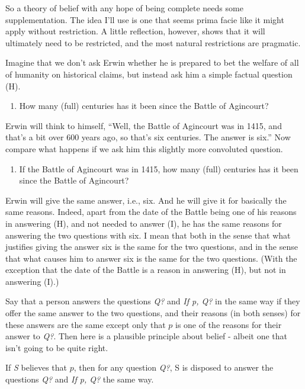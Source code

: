 \documentclass[11pt,]{book}
\providecommand{\tightlist}{%
  \setlength{\itemsep}{0pt}\setlength{\parskip}{0pt}}
\begin{document}
So a theory of belief with any hope of being complete needs some supplementation. The idea I'll use is one that seems prima facie like it might apply without restriction. A little reflection, however, shows that it will ultimately need to be restricted, and the most natural restrictions are pragmatic.

Imagine that we don't ask Erwin whether he is prepared to bet the welfare of all of humanity on historical claims, but instead ask him a simple factual question (H).

\begin{enumerate}
\def\labelenumi{(\Alph{enumi})}
\setcounter{enumi}{7}
\tightlist
\item
  How many (full) centuries has it been since the Battle of Agincourt?
\end{enumerate}

Erwin will think to himself, ``Well, the Battle of Agincourt was in 1415, and that's a bit over 600 years ago, so that's six centuries. The answer is six.'' Now compare what happens if we ask him this slightly more convoluted question.

\begin{enumerate}
\def\labelenumi{(\Roman{enumi})}
\tightlist
\item
  If the Battle of Agincourt was in 1415, how many (full) centuries has it been since the Battle of Agincourt?
\end{enumerate}

Erwin will give the same answer, i.e., six. And he will give it for basically the same reasons. Indeed, apart from the date of the Battle being one of his reasons in answering (H), and not needed to answer (I), he has the same reasons for answering the two questions with six. I mean that both in the sense that what justifies giving the answer six is the same for the two questions, and in the sense that what causes him to answer six is the same for the two questions. (With the exception that the date of the Battle is a reason in answering (H), but not in answering (I).)

Say that a person answers the questions \emph{Q?} and \emph{If p, Q?} in the same way if they offer the same answer to the two questions, and their reasons (in both senses) for these answers are the same except only that \(p\) is one of the reasons for their answer to \emph{Q?}. Then here is a plausible principle about belief - albeit one that isn't going to be quite right.

\begin{description}
\tightlist
\item[Unrestricted Conditional Questions]
If \emph{S} believes that \(p\), then for any question \emph{Q?}, S is disposed to answer the questions \emph{Q?} and \emph{If p, Q?} the same way.
\end{description}
\end{document}
